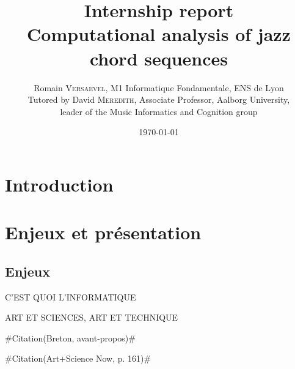 \documentclass[a4paper,12pt]{article}
\title{\Large Internship report \\ \LARGE Computational analysis of jazz chord sequences}
\author{\normalsize Romain \textsc{Versaevel}, M1 Informatique Fondamentale, ENS de Lyon\\
\normalsize Tutored by David \textsc{Meredith}, Associate Professor, Aalborg University,\\
\normalsize leader of the Music Informatics and Cognition group\\}
\date{\today}
\newcommand{\guill}[1]{«~#1~»}
\newcommand{\zitat}[2]{\#Citation(#2)\#}
\newcommand{\tpp}[0]{[\dots]}
\begin{document}
\maketitle
\newpage

\tableofcontents

\newpage

\section{Introduction}

\section{Enjeux et présentation}

\subsection*{Enjeux}

C'EST QUOI L'INFORMATIQUE

ART ET SCIENCES, ART ET TECHNIQUE

\zitat{L'ordinateur, pendant longtemps, a été la seule vitrine de l'informatique aux yeux du grand public. Chacun sait mieux maintenant que ce domaine comporte de multiples dimensions : les enjeux industriels, l'univers complexe de la programmation et des langages, les foisonnements des différents usages, mais aussi l'affirmation que la logique et une certaine forme de rationalité dont désormais partie de notre culture contemporaine \tpp~
Désormais de très larges publics sont directement concernés par l'informatique. La question qui est aujourd’hui d'actualité en matières d'informatique est celle de la maîtrise de enjeux que soulève son insertion dans la vie quotidienne. Voilà pourquoi on parle tant de \guill{culture informatique}.}
{Breton, avant-propos}

\zitat{The USA-based curator Christiane Paul organized a pair of related process-oriented shows, both called \emph{CODeDOC}, at the Whitney Museum of American Art in New York (2002) and at Ars Electronica (2003) to explore the conceptual and aesthetic intricacies of code-based art. Artists in each exhibition were given a common challenge for example, to animate three circles connected by lines) and then invited to generate code-based responses. Paul explained her motivations this way in the online catalogue of the Ars Electronica show: \guill{I wanted to raise questions about software art as artistic practice\dots~One intent of the project certainly was to memystify the notion of code as a mysterious, hidden driving force and to reveal the code to the viewer. Among the questions that seemed important to address or clarify were the following: do \emph{signature}, \emph{voice}, and aesthetics of an artist manifest themselbes equally in the written code and its exxecuted results? Will reading the source code enhance the perception of the word? Does it in fact add anything at all or just create an emphasis on \emph{technicalities} that is unnecessary, alienating, and obscures the work?}}
{Art+Science Now, p. 161}
\end{document}
